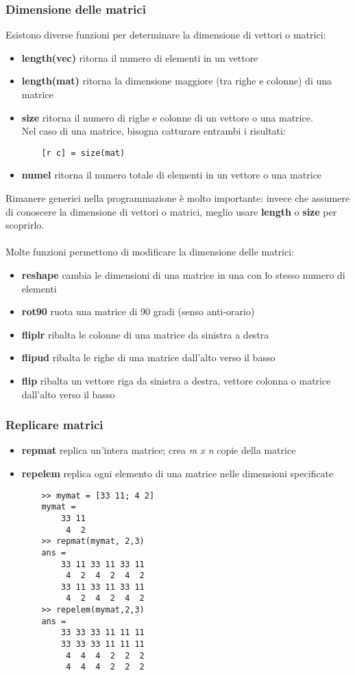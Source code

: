 \documentclass[a4paper, 10pt]{article}
\begin{document}
\subsubsection{Dimensione delle matrici}
Esistono diverse funzioni per determinare la dimensione di vettori o matrici:

\begin{itemize}
\item \textbf{length(vec)} ritorna il numero di elementi in un vettore
\item \textbf{length(mat)} ritorna la dimensione maggiore (tra righe e colonne) di una matrice
\item \textbf{size} ritorna il numero di righe e colonne di un vettore o una matrice. \\
Nel caso di una matrice, bisogna catturare entrambi i risultati: 	\begin{lstlisting}
	[r c] = size(mat)
	\end{lstlisting}
\item \textbf{numel} ritorna il numero totale di elementi in un vettore o una matrice
\end{itemize}
Rimanere generici nella programmazione è molto importante: invece che assumere di conoscere la dimensione di vettori o matrici, meglio usare \textbf{length} o \textbf{size} per scoprirlo.\\
\\
Molte funzioni permettono di modificare la dimensione delle matrici:
\begin{itemize}
\item \textbf{reshape} cambia le dimensioni di una matrice in una con lo stesso numero di elementi
\item \textbf{rot90} ruota una matrice di 90 gradi (senso anti-orario)
\item \textbf{fliplr} ribalta le colonne di una matrice da sinistra a destra
\item \textbf{flipud} ribalta le righe di una matrice dall'alto verso il basso
\item \textbf{flip} ribalta un vettore riga da sinistra a destra, vettore colonna o matrice dall'alto verso il basso
\end{itemize}

\subsubsection{Replicare matrici}
\begin{itemize}
\item \textbf{repmat} replica un'intera matrice; crea \textit{m x n} copie della matrice
\item \textbf{repelem} replica ogni elemento di una matrice nelle dimensioni specificate

\begin{lstlisting}
	>> mymat = [33 11; 4 2]
	mymat =
		33 11
		 4  2
	>> repmat(mymat, 2,3)
	ans =
		33 11 33 11 33 11
		 4  2  4  2  4  2
		33 11 33 11 33 11
		 4  2  4  2  4  2
	>> repelem(mymat,2,3)
	ans =
		33 33 33 11 11 11
		33 33 33 11 11 11
		 4  4  4  2  2  2
		 4  4  4  2  2  2
\end{lstlisting}

\end{itemize}
\end{document}
